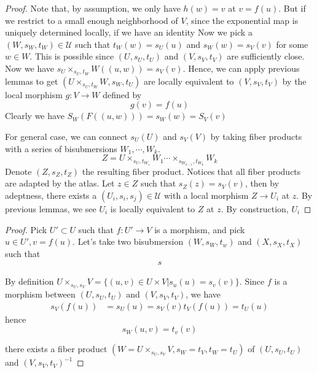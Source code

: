 \documentclass[12pt]{amsart}
\theoremstyle{definition}
\theoremstyle{remark}
\numberwithin{equation}{section}
\newcommand{\1}{{\mathbb{1}}}
\begin{document}
\begin{proof}
    Note that, by assumption, we only have $h(w) = v$ at $v = f(u)$. But if we restrict to a small enough neighborhood of $V$, since the exponential map is uniquely determined locally, if we have an identity 
    Now we pick a $(W, s_W, t_W)\in \mathcal{U}$ such that $t_W(w) = s_U(u)$ and $s_W(w) = s_V(v)$ for some $w\in W$. This is possible since $(U, s_U, t_U)$ and $(V, s_V, t_V)$ are sufficiently close. Now we have $s_U\times_{s_U, t_W} W((u,w)) = s_V(v)$. Hence, we can apply previous lemmas to get $(U\times_{s_U, t_W} W, s_W, t_U)$ are locally equivalent to $(V, s_V, t_V)$ by the local morphism $g: V\to W$ defined by
    \begin{equation*}
        g(v) = f(u)
    \end{equation*}
    Clearly we have $S_W(F((u,w))) = s_W(w) = S_V(v)$
    
    For general case, we can connect $s_U(U)$ and $s_V(V)$ by taking fiber products with a series of bisubmersions $W_1, \cdots, W_k$.
    \begin{equation*}
        Z = U\times_{s_U, t_{W_1}} W_1\cdots \times_{s_{W_{k-1}}, t_{W_k}} W_k
    \end{equation*}
    Denote $(Z, s_Z, t_Z)$ the resulting fiber product.
    Notices that all fiber products are adapted by the atlas. Let $z\in Z$ such that $s_Z(z) = s_V(v)$, then by adeptness, there exists a $(U_i, s_i, s_j) \in \mathcal{U}$ with a local morphism $Z\to U_i$ at $z$. By previous lemmas, we see $U_i$ is locally equivalent to $Z$ at $z$. By construction, $U_i$ 
\end{proof}





\begin{proof}
Pick $U'\subset U$ such that $f:U'\to V$ is a morphism, and pick $u\in U', v = f(u)$.
Let's take two bisubmersion $(W, s_W, t_w)$ and $(X, s_X, t_X)$ such that
\begin{align*}
    s
\end{align*}





    By definition $U\times_{s_U, s_V} V = \{(u,v)\in U\times V| s_u(u) = s_v(v) \} $. Since $f$ is a morphism between $(U, s_U, t_U)$ and $(V, s_V, t_V)$, we have 
    \begin{align*}
        s_V(f(u)) &= s_U(u) =  s_V(v)
        t_V(f(u)) = t_U(u)
    \end{align*}
    hence 
    $$
    s_W(u,v) = t_v(v)
    $$
    
    there exists a fiber product $(W = U\times_{s_U, s_V} V, s_W = t_V, t_W = t_U)$ of $(U, s_U, t_U)$ and  $(V, s_V, t_V)^{-1} $
\end{proof}
\end{document}
